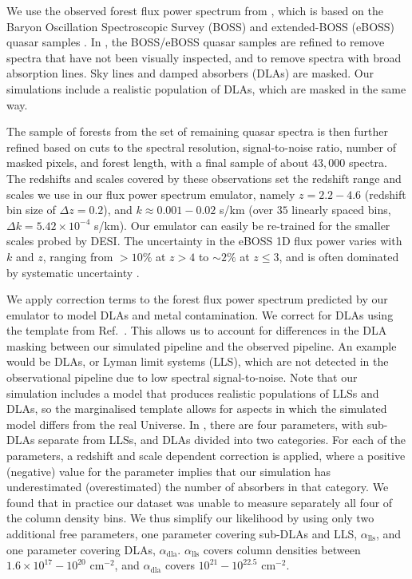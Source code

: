 We use the observed \lya forest flux power spectrum from \cite{2019JCAP...07..017C}, which is based on the Baryon Oscillation Spectroscopic Survey (BOSS) and extended-BOSS (eBOSS) quasar samples \cite{2013AJ....145...10D, 2016AJ....151...44D}.
In \cite{2019JCAP...07..017C}, the BOSS/eBOSS quasar samples are refined to remove spectra that have not been visually inspected, and to remove spectra with broad absorption lines.
Sky lines and damped \lya absorbers (DLAs) are masked.
Our simulations include a realistic population of DLAs, which are masked in the same way.

The sample of \lya forests from the set of remaining quasar spectra is then further refined based on cuts to the spectral resolution, signal-to-noise ratio, number of masked pixels, and forest length, with a final sample of about $43,000$ spectra.
The redshifts and scales covered by these observations set the redshift range and scales we use in our flux power spectrum emulator, namely $z=2.2-4.6$ (redshift bin size of $\Delta z = 0.2$), and $k\approx0.001-0.02$ s/km (over $35$ linearly spaced bins, $\Delta k = 5.42\times10^{-4}$ s/km).
Our emulator can easily be re-trained for the smaller scales probed by DESI.
The uncertainty in the eBOSS 1D flux power varies with $k$ and $z$, ranging from $> 10 \%$ at $z > 4$ to $\sim 2\%$ at $z \leq 3$, and is often dominated by systematic uncertainty \cite{2019JCAP...07..017C}.

We apply correction terms to the \lya forest flux power spectrum predicted by our emulator to model DLAs and metal contamination.
We correct for DLAs using the template from Ref.~\cite{2018MNRAS.474.3032R}. This allows us to account for differences in the DLA masking between our simulated pipeline and the observed pipeline.
An example would be DLAs, or Lyman limit systems (LLS), which are not detected in the observational pipeline due to low spectral signal-to-noise.
Note that our simulation includes a model that produces realistic populations of LLSs and DLAs, so the marginalised template allows for aspects in which the simulated model differs from the real Universe.
In \cite{2018MNRAS.474.3032R}, there are four parameters, with sub-DLAs separate from LLSs, and DLAs divided into two categories.
For each of the parameters, a redshift and scale dependent correction is applied, where a positive (negative) value for the parameter implies that our simulation has underestimated (overestimated) the number of absorbers in that category. 
We found that in practice our dataset was unable to measure separately all four of the column density bins.
We thus simplify our likelihood by using only two additional free parameters, one parameter covering sub-DLAs and LLS, $\alpha_{\mathrm{lls}}$, and one parameter covering DLAs, $\alpha_{\mathrm{dla}}$.
$\alpha_{\mathrm{lls}}$ covers column densities between $1.6\times10^{17} - 10^{20}$ cm$^{-2}$, and $\alpha_{\mathrm{dla}}$ covers $10^{21}-10^{22.5}$  cm$^{-2}$. 

